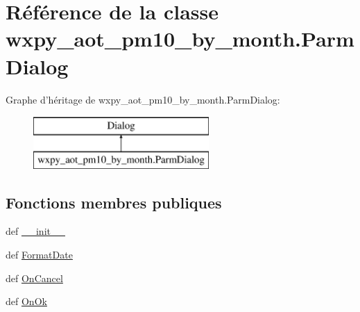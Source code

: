 \hypertarget{classwxpy__aot__pm10__by__month_1_1_parm_dialog}{\section{Référence de la classe wxpy\-\_\-aot\-\_\-pm10\-\_\-by\-\_\-month.\-Parm\-Dialog}
\label{classwxpy__aot__pm10__by__month_1_1_parm_dialog}
}
Graphe d'héritage de wxpy\-\_\-aot\-\_\-pm10\-\_\-by\-\_\-month.\-Parm\-Dialog\-:\begin{figure}[H]
\begin{center}
\leavevmode
\includegraphics[height=2.000000cm]{classwxpy__aot__pm10__by__month_1_1_parm_dialog}
\end{center}
\end{figure}
\subsection*{Fonctions membres publiques}
\begin{DoxyCompactItemize}
\item 
def \hyperlink{classwxpy__aot__pm10__by__month_1_1_parm_dialog_a8695ab9eea88c4cd85400b58af5c4a99}{\-\_\-\-\_\-init\-\_\-\-\_\-}
\item 
def \hyperlink{classwxpy__aot__pm10__by__month_1_1_parm_dialog_a0d2482b2a3170196d3c4aab90e25596e}{Format\-Date}
\item 
def \hyperlink{classwxpy__aot__pm10__by__month_1_1_parm_dialog_a51a1ad23e3c387bb92052d66d4a99071}{On\-Cancel}
\item 
def \hyperlink{classwxpy__aot__pm10__by__month_1_1_parm_dialog_a329d7ab5ad3a0881df2614a9e485801e}{On\-Ok}
\end{DoxyCompactItemize}
